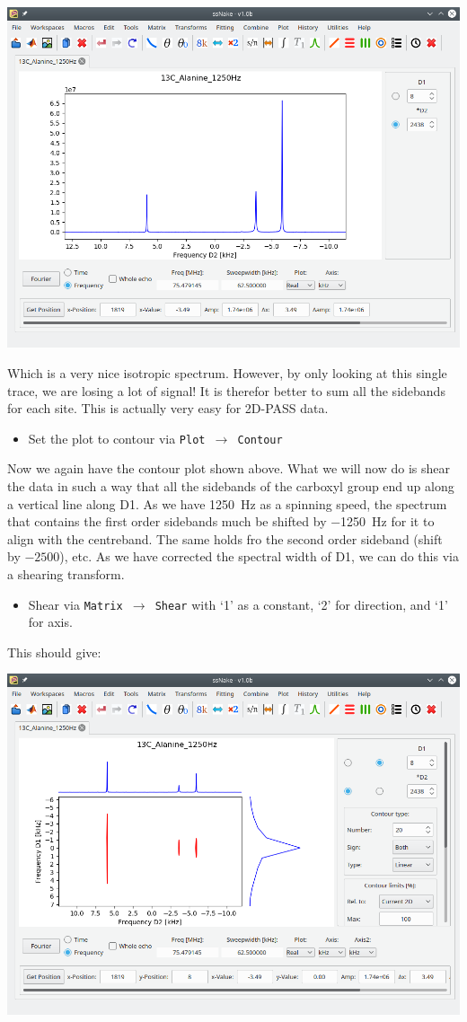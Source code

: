 \documentclass[11pt,a4paper]{article}
\begin{document}
\begin{center}
\includegraphics[width=0.8\linewidth]{Figs/Fig5.png}
\end{center}
Which is a very nice isotropic spectrum. However, by only looking at this single trace, we are
losing a lot of signal! It is therefor better to sum all the sidebands for each site. This is
actually very easy for 2D-PASS data.
\begin{itemize}
  \item Set the plot to contour via \texttt{Plot $\longrightarrow$ Contour}
\end{itemize}
Now we again have the contour plot shown above. What we will now do is shear the data in such a way
that all the sidebands of the carboxyl group end up along a vertical line along D1. As we have
\SI{1250}{\Hz} as a spinning speed, the spectrum that contains the first order sidebands much be shifted by
\SI{-1250}{\Hz} for it to align with the centreband. The same holds fro the second order sideband
(shift by $-2500$), etc. As we have corrected the spectral width of D1, we can do this via a
shearing transform.
\begin{itemize}
  \item Shear via \texttt{Matrix $\longrightarrow$ Shear} with `1' as a constant, `2' for direction,
	 and `1' for axis.
\end{itemize}
This should give:
\begin{center}
\includegraphics[width=0.8\linewidth]{Figs/Fig6.png}
\end{center}
\end{document}
